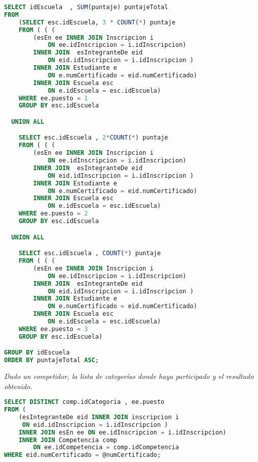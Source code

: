 \begin{lstlisting}[language=SQL]
SELECT idEscuela  , SUM(puntaje) puntajeTotal
FROM
    (SELECT esc.idEscuela, 3 * COUNT(*) puntaje
    FROM ( ( (
        (esEn ee INNER JOIN Inscripcion i
            ON ee.idInscripcion = i.idInscripcion)
        INNER JOIN  esIntegranteDe eid
            ON eid.idInscripcion = i.idInscripcion )
        INNER JOIN Estudiante e
            ON e.numCertificado = eid.numCertificado)
        INNER JOIN Escuela esc
            ON e.idEscuela = esc.idEscuela)
    WHERE ee.puesto = 1
    GROUP BY esc.idEscuela

  UNION ALL

    SELECT esc.idEscuela , 2*COUNT(*) puntaje
    FROM ( ( (
        (esEn ee INNER JOIN Inscripcion i
            ON ee.idInscripcion = i.idInscripcion)
        INNER JOIN  esIntegranteDe eid
            ON eid.idInscripcion = i.idInscripcion )
        INNER JOIN Estudiante e
            ON e.numCertificado = eid.numCertificado)
        INNER JOIN Escuela esc
            ON e.idEscuela = esc.idEscuela)
    WHERE ee.puesto = 2
    GROUP BY esc.idEscuela

  UNION ALL

    SELECT esc.idEscuela , COUNT(*) puntaje
    FROM ( ( (
        (esEn ee INNER JOIN Inscripcion i
            ON ee.idInscripcion = i.idInscripcion)
        INNER JOIN  esIntegranteDe eid
            ON eid.idInscripcion = i.idInscripcion )
        INNER JOIN Estudiante e
            ON e.numCertificado = eid.numCertificado)
        INNER JOIN Escuela esc
            ON e.idEscuela = esc.idEscuela)
    WHERE ee.puesto = 3
    GROUP BY esc.idEscuela)

GROUP BY idEscuela
ORDER BY puntajeTotal ASC;
\end{lstlisting}


\emph{Dado un competidor, la lista de categorías donde haya participado y el resultado obtenido.}
\begin{lstlisting}[language=SQL]
SELECT DISTINCT comp.idCategoria , ee.puesto
FROM (
    (esIntegranteDe eid INNER JOIN inscripcion i
     ON eid.idInscripcion = i.idInscripcion )
    INNER JOIN esEn ee ON ee.idInscripcion = i.idInscripcion)
    INNER JOIN Competencia comp
        ON ee.idCompetencia = comp.idCompetencia
WHERE eid.numCertificado = @numCertificado;
\end{lstlisting}



